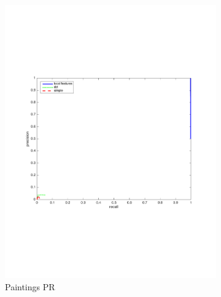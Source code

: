 \documentclass[english,12pt,a4paper,pdftex,elec,utf8, table]{aaltothesis}
\begin{document}
\begin{figure}[htb]
\begin{center}
\begin{subfigure}[b]{0.49\textwidth}
    \includegraphics[width=\textwidth]{figures/Border10PR.pdf}
    \caption{Paintings PR}
    \label{Borderrocthinglink}
  \end{subfigure}
  \begin{subfigure}[b]{0.49\textwidth}

\end{subfigure}
\end{center}
\end{figure}
\end{document}
